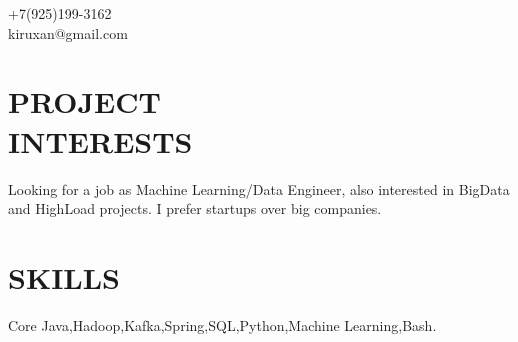 \documentclass[margin,line]{resume}
\begin{document}
{
	\sc
    \hfill +7(925)199-3162                  \vspace{0mm}\\\vspace{0mm}%
    \hfill kiruxan@gmail.com            \vspace{0mm}\\\vspace{-10mm}%
\vspace{1mm}
}


\begin{resume}

\vspace{1mm}

    \section{\mysidestyle \textbf{\large{P}\small{ROJECT\\INTERESTS}}}

	Looking for a job as Machine Learning/Data Engineer, also interested in BigData and HighLoad projects. I prefer startups over big companies.


\sectionline

    \section{\mysidestyle \textbf{\large{S}\small{KILLS}}}

    Core Java,\hspace{2mm}Hadoop,\hspace{2mm}Kafka,\hspace{2mm}Spring,\hspace{2mm}SQL,\hspace{2mm}Python,\hspace{2mm}Machine Learning,\hspace{2mm}Bash.


\sectionline


\end{resume}
\end{document}
